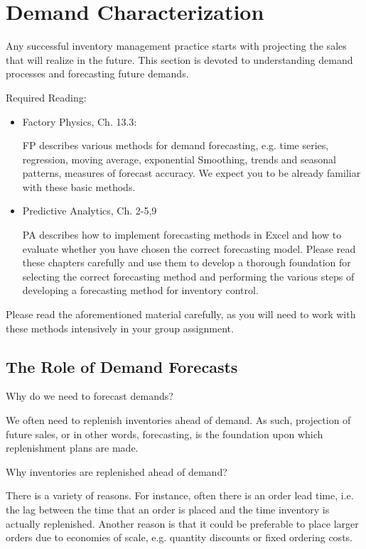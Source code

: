 \section{Demand Characterization}
\label{sec:character}

Any successful inventory management practice starts with projecting the sales that will realize in the future. This section is devoted to understanding demand processes and forecasting future demands. 


Required Reading:
\begin{itemize}
\item Factory Physics, Ch. 13.3: 

FP describes various methods for demand forecasting, e.g. time series, regression, moving average, exponential Smoothing, trends and seasonal patterns, measures of forecast accuracy. We expect you to be already familiar with these basic methods. 
\item Predictive Analytics, Ch. 2-5,9

PA describes how to implement forecasting methods in Excel and how to evaluate whether you have chosen the correct forecasting model. Please read these chapters carefully and use them to develop a thorough foundation for selecting the correct forecasting method and performing the various steps of developing a forecasting method for inventory control.
\end{itemize}
Please read the aforementioned material carefully, as you will need to work with these methods intensively in your group assignment.
 

\subsection{The Role of Demand Forecasts}

\begin{question}
Why do we need to forecast demands?

  \begin{solution}
    We often need to replenish inventories ahead of demand. As such, projection of future sales, or in other words, forecasting, is the foundation upon which replenishment plans are made. 
  \end{solution}
\end{question}


\begin{question}
Why inventories are replenished ahead of demand?

  \begin{solution}
    There is a variety of reasons. For instance, often there is an order lead time, i.e. the lag between the time that an order is placed and the time inventory is actually replenished. Another reason is that it could be preferable to place larger orders due to economies of scale, e.g. quantity discounts or fixed ordering costs. 
  \end{solution}
\end{question}

